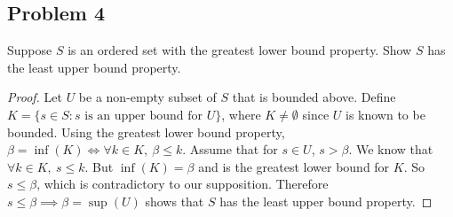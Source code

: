 \documentclass{amsart}
\begin{document}
\subsection*{Problem 4} Suppose $S$ is an ordered set with the greatest lower bound property. Show $S$ has the least upper bound property. 
\begin{proof}
Let $U$ be a non-empty subset of $S$ that is bounded above. Define $K =\{s \in S: s \text{ is an upper bound for } U\}$, where $K \neq \emptyset$ since $U$ is known to be bounded. Using the greatest lower bound property, $\beta = \inf(K) \Longleftrightarrow \forall k \in K,\ \beta \leq k$. Assume that for $s \in U$, $s > \beta$. We know that $\forall k \in K, \ s \leq k$. But $\inf(K)=\beta$ and is the greatest lower bound for $K$. So $s \leq \beta$, which is contradictory to our supposition. Therefore $s \leq \beta \implies \beta = \sup(U)$ shows that $S$ has the least upper bound property. 
\end{proof}
    
\end{document}
